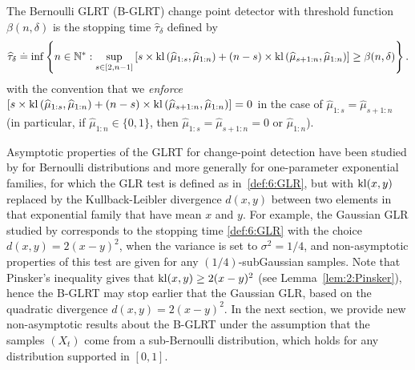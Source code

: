 \begin{definition}\label{def:6:GLRDef}
\begin{leftbar}[defnbar]  %
    The Bernoulli GLRT (B-GLRT) change point detector with threshold function $\beta(n,\delta)$ is the stopping time $\widehat{\tau}_{\delta}$ defined by
    \begin{equation}\label{def:6:GLR}
        \widehat{\tau}_{\delta} \overset{.}{=} \inf \left\{ n \in \mathbb{N}^* : \sup_{s \in [2,n-1]} \left[s \times \mathrm{kl}\left(\widehat{\mu}_{1:s},\widehat{\mu}_{1:n}\right) + (n-s) \times \mathrm{kl}\left(\widehat{\mu}_{s+1:n},\widehat{\mu}_{1:n}\right)\right] \geq \beta(n,\delta)\right\}.
    \end{equation}
    with the convention that we \emph{enforce} $\left[s \times \mathrm{kl}\left(\widehat{\mu}_{1:s},\widehat{\mu}_{1:n}\right) + (n-s) \times \mathrm{kl}\left(\widehat{\mu}_{s+1:n},\widehat{\mu}_{1:n}\right)\right] = 0$
    in the case of $\widehat{\mu}_{1:s} = \widehat{\mu}_{s+1:n}$
    (in particular, if $\widehat{\mu}_{1:n} \in \{0,1\}$, then $\widehat{\mu}_{1:s} = \widehat{\mu}_{s+1:n} = 0$ or $\widehat{\mu}_{1:n}$).
\end{leftbar}  %
\end{definition}

Asymptotic properties of the GLRT for change-point detection have been studied by \cite{LaiXing10} for Bernoulli distributions and more generally for one-parameter exponential families, for which the GLR test is defined as in~\eqref{def:6:GLR}, but with $\mathrm{kl}(x,y)$ replaced by the Kullback-Leibler divergence $d(x,y)$ between two elements in that exponential family that have mean $x$ and $y$.
For example, the Gaussian GLR studied by \cite{Maillard2018GLR} corresponds to the stopping time \eqref{def:6:GLR} with the choice $d(x,y) = 2(x-y)^2$, when the variance is set to $\sigma^2=1/4$, and non-asymptotic properties of this test are given for any $(1/4)$-subGaussian samples.
Note that Pinsker's inequality gives that $\mathrm{kl}(x,y) \geq 2(x-y)^2$ (see Lemma~\ref{lem:2:Pinsker}), hence the B-GLRT may stop earlier that the Gaussian GLR, based on the quadratic divergence $d(x,y) = 2(x-y)^2$.
%
In the next section, we provide new non-asymptotic results about the B-GLRT under the assumption that the samples $(X_t)$ come from a sub-Bernoulli distribution, which holds for any distribution supported in $[0,1]$.


